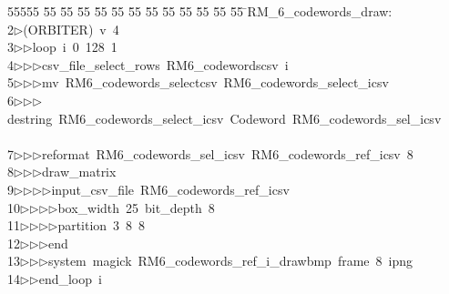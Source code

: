%
%
\begin{tabbing}
55555 \= 55 \= 55 \= 55 \= 55 \= 55 \= 55 \= 55 \= 55 \= 55 \= 55 \= 55 \= 55 \= \>RM\_6\_codewords\_draw:\\[0pt]
2\>$\triangleright$\>(ORBITER)\ v\ 4\ \\[0pt]
3\>$\triangleright$\>$\triangleright$\>loop\ i\ 0\ 128\ 1\ \\[0pt]
4\>$\triangleright$\>$\triangleright$\>$\triangleright$\>csv\_file\_select\_rows\ RM6\_codewordscsv\ i\ \\[0pt]
5\>$\triangleright$\>$\triangleright$\>$\triangleright$\>mv\ RM6\_codewords\_selectcsv\ RM6\_codewords\_select\_icsv\ \\[0pt]
6\>$\triangleright$\>$\triangleright$\>$\triangleright$\>destring\ RM6\_codewords\_select\_icsv\ Codeword\ RM6\_codewords\_sel\_icsv\ \\[0pt]
\>\\[0pt]
7\>$\triangleright$\>$\triangleright$\>$\triangleright$\>reformat\ RM6\_codewords\_sel\_icsv\ RM6\_codewords\_ref\_icsv\ 8\ \\[0pt]
8\>$\triangleright$\>$\triangleright$\>$\triangleright$\>draw\_matrix\ \\[0pt]
9\>$\triangleright$\>$\triangleright$\>$\triangleright$\>$\triangleright$\>input\_csv\_file\ RM6\_codewords\_ref\_icsv\ \\[0pt]
10\>$\triangleright$\>$\triangleright$\>$\triangleright$\>$\triangleright$\>box\_width\ 25\ bit\_depth\ 8\ \\[0pt]
11\>$\triangleright$\>$\triangleright$\>$\triangleright$\>$\triangleright$\>partition\ 3\ 8\ 8\ \\[0pt]
12\>$\triangleright$\>$\triangleright$\>$\triangleright$\>end\ \\[0pt]
13\>$\triangleright$\>$\triangleright$\>$\triangleright$\>system\ magick\ RM6\_codewords\_ref\_i\_drawbmp\ frame\ 8\ ipng\ \\[0pt]
14\>$\triangleright$\>$\triangleright$\>end\_loop\ i\\[0pt]

\end{tabbing}
